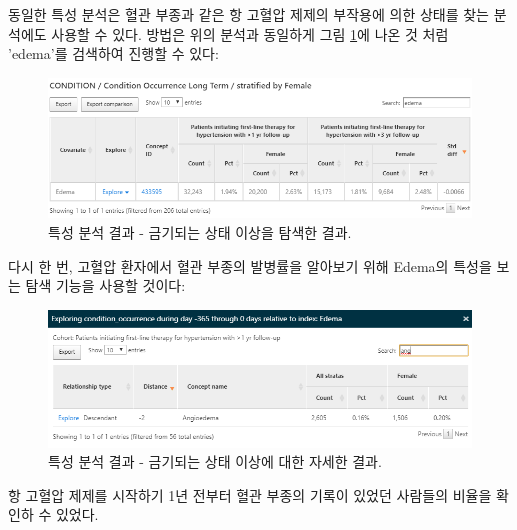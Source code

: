 \documentclass[11pt]{book}
\theoremstyle{definition}
\theoremstyle{definition}
\theoremstyle{definition}
\theoremstyle{remark}
\begin{document}
동일한 특성 분석은 혈관 부종과 같은 항 고혈압 제제의 부작용에 의한
상태를 찾는 분석에도 사용할 수 있다. 방법은 위의 분석과 동일하게 그림
\ref{fig:atlasCharacterizationResultsContra}에 나온 것 처럼 'edema'를
검색하여 진행할 수 있다:

\begin{figure}

{\centering \includegraphics[width=1\linewidth]{images/Characterization/atlasCharacterizationResultsContra} 

}

\caption{특성 분석 결과 - 금기되는 상태 이상을 탐색한 결과.}\label{fig:atlasCharacterizationResultsContra}
\end{figure}

다시 한 번, 고혈압 환자에서 혈관 부종의 발병률을 알아보기 위해 Edema의
특성을 보는 탐색 기능을 사용할 것이다:

\begin{figure}

{\centering \includegraphics[width=1\linewidth]{images/Characterization/atlasCharacterizationResultsContraExplore} 

}

\caption{특성 분석 결과 - 금기되는 상태 이상에 대한 자세한 결과.}\label{fig:atlasCharacterizationResultsContraExplore}
\end{figure}

항 고혈압 제제를 시작하기 1년 전부터 혈관 부종의 기록이 있었던 사람들의
비율을 확인하 수 있었다.
\end{document}
